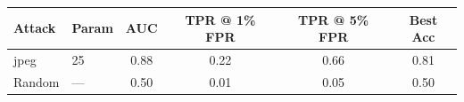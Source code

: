 \begin{tabular}{llcccc}
\toprule
Attack & Param & AUC & TPR @ 1\% FPR & TPR @ 5\% FPR & Best Acc \\
\midrule
jpeg & 25 & 0.88 & 0.22 & 0.66 & 0.81 \\
Random & — & 0.50 & 0.01 & 0.05 & 0.50 \\
\bottomrule
\end{tabular}
